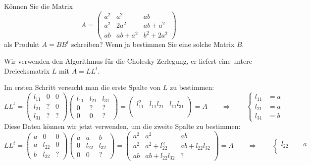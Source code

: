 Können Sie die Matrix
\[
A
=
\begin{pmatrix}
a^2&a^2&ab\\
a^2&2a^2&ab+a^2\\
ab&ab+a^2&b^2+2a^2
\end{pmatrix}
\]
als Produkt $A=BB^t$ schreiben?
Wenn ja bestimmen Sie eine solche Matrix $B$.


\begin{loesung}
Wir verwenden den Algorithmus für die Cholesky-Zerlegung, er liefert
eine untere Dreiecksmatrix $L$ mit $A=LL^t$.

Im ersten Schritt versucht man die erste Spalte von $L$ zu bestimmen:
\[
LL^t
=
\begin{pmatrix}
l_{11}&0&0\\
l_{21}&?&0\\
l_{31}&?&?
\end{pmatrix}
\begin{pmatrix}
l_{11}&l_{21}&l_{31}\\
0&?&?\\
0&0&?
\end{pmatrix}
=
\begin{pmatrix}
l_{11}^2&l_{11}l_{21}&l_{11}l_{31}\\
&&\\
&&
\end{pmatrix}
=
A
\qquad\Rightarrow\qquad
\left\{
\begin{aligned}
l_{11}&=a\\
l_{21}&=a\\
l_{31}&=b
\end{aligned}
\right.
\]
Diese Daten können wir jetzt verwenden, um die zweite Spalte zu bestimmen:
\[
LL^t
=
\begin{pmatrix}
a&0&0\\
a&l_{22}&0\\
b&l_{32}&?
\end{pmatrix}
\begin{pmatrix}
a&a&b\\
0&l_{22}&l_{32}\\
0&0&?
\end{pmatrix}
=
\begin{pmatrix}
a^2&a^2&ab\\
a^2&a^2+l_{22}^2& ab+l_{22}l_{32}\\
ab &ab+l_{22}l_{32} &?
\end{pmatrix}
=
A
\qquad\Rightarrow\qquad
\left\{
\begin{aligned}
l_{22}&=a\\

\end{aligned}\]
\end{loesung}
